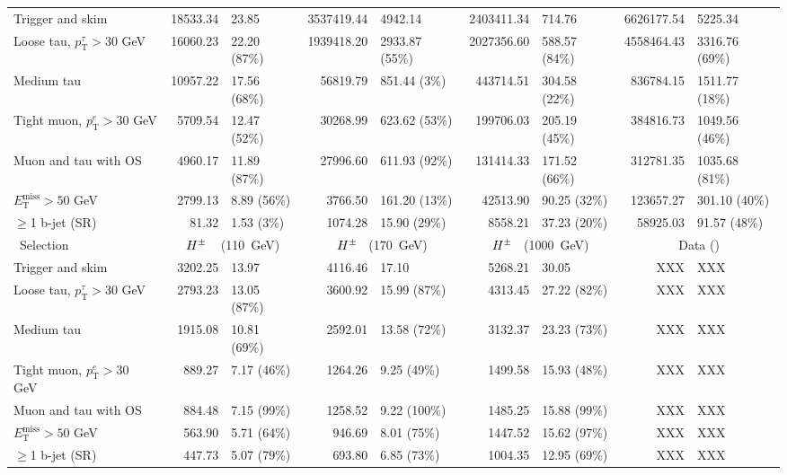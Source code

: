 \begin{table}[!thp]
\begin{center}
{\begin{tabular}{|l|r@{ $\pm$ }l|r@{ $\pm$ }l|r@{ $\pm$ }l|r@{ $\pm$ }l|}
			\hline
			Trigger and skim                            & 18533.34 & 23.85 & 3537419.44 & 4942.14 & 2403411.34 & 714.76 & 6626177.54 & 5225.34 \\
			Loose tau, $p_\mathrm{T}^{\tau}>30$ GeV   & 16060.23 & 22.20 (87\%) & 1939418.20 & 2933.87 (55\%) & 2027356.60 & 588.57 (84\%) & 4558464.43 & 3316.76 (69\%) \\
			Medium tau                    & 10957.22 & 17.56 (68\%) & 56819.79 & 851.44 (3\%) & 443714.51 & 304.58 (22\%) & 836784.15 & 1511.77 (18\%) \\
			Tight muon, $p_\mathrm{T}^{e}>30$ GeV           & 5709.54 & 12.47 (52\%) & 30268.99 & 623.62 (53\%) & 199706.03 & 205.19 (45\%) & 384816.73 & 1049.56 (46\%) \\
			Muon and tau with OS                         & 4960.17 & 11.89 (87\%) & 27996.60 & 611.93 (92\%) & 131414.33 & 171.52 (66\%) & 312781.35 & 1035.68 (81\%) \\
			$E_\mathrm{T}^\mathrm{miss}>50$ GeV\       & 2799.13 & 8.89 (56\%) & 3766.50 & 161.20 (13\%) & 42513.90 & 90.25 (32\%) & 123657.27 & 301.10 (40\%) \\
			$\ge$1 b-jet (SR)                          & 81.32 & 1.53 (3\%) & 1074.28 & 15.90 (29\%) & 8558.21 & 37.23 (20\%) & 58925.03 & 91.57 (48\%) \\
			\hline\
			Selection                                        & \multicolumn{2}{c|}{$H^{\pm}$ $\phantom{c|}$(110~GeV)} & \multicolumn{2}{c|}{$H^{\pm}$ $\phantom{0}$(170~GeV)} & \multicolumn{2}{c|}{$H^{\pm}$ $\phantom{0}$(1000~GeV)} & \multicolumn{2}{c|}{Data (\LUMI )}  \\ 
			\hline
			Trigger and skim                            & 3202.25 & 13.97 & 4116.46 & 17.10 & 5268.21 & 30.05 & XXX & XXX \\
			Loose tau, $p_\mathrm{T}^{\tau}>30$ GeV & 2793.23 & 13.05 (87\%) & 3600.92 & 15.99 (87\%) & 4313.45 & 27.22 (82\%) & XXX & XXX \\
			Medium tau   & 1915.08 & 10.81 (69\%) & 2592.01 & 13.58 (72\%) & 3132.37 & 23.23 (73\%) & XXX & XXX \\
			Tight muon, $p_\mathrm{T}^{e}>30$ GeV\  & 889.27 & 7.17 (46\%) & 1264.26 & 9.25 (49\%) & 1499.58 & 15.93 (48\%) & XXX & XXX \\
			Muon and tau with OS                    & 884.48 & 7.15 (99\%) & 1258.52 & 9.22 (100\%) & 1485.25 & 15.88 (99\%) & XXX & XXX \\
			$E_\mathrm{T}^\mathrm{miss}>50$ GeV\          & 563.90 & 5.71 (64\%) & 946.69 & 8.01 (75\%) & 1447.52 & 15.62 (97\%) & XXX & XXX \\
			$\ge$1 b-jet (SR)                            & 447.73 & 5.07 (79\%) & 693.80 & 6.85 (73\%) & 1004.35 & 12.95 (69\%) & XXX & XXX \\
			\hline
			\end{tabular}}
		 	\end{center}
	   \end{table}


